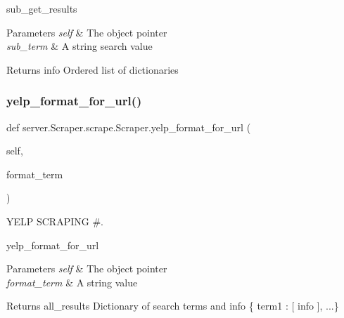 sub\+\_\+get\+\_\+results 
\begin{DoxyParams}{Parameters}
{\em self} & The object pointer \\
\hline
{\em sub\+\_\+term} & A string search value \\
\hline
\end{DoxyParams}
\begin{DoxyReturn}{Returns}
info Ordered list of dictionaries 
\end{DoxyReturn}
\mbox{\label{classserver_1_1_scraper_1_1scrape_1_1_scraper_ab6b8f8032bc10cbe520e5310703b8a9b}} 
\subsubsection{\texorpdfstring{yelp\+\_\+format\+\_\+for\+\_\+url()}{yelp\_format\_for\_url()}}
{\footnotesize\ttfamily def server.\+Scraper.\+scrape.\+Scraper.\+yelp\+\_\+format\+\_\+for\+\_\+url (\begin{DoxyParamCaption}\item[{}]{self,  }\item[{}]{format\+\_\+term }\end{DoxyParamCaption})}



Y\+E\+LP S\+C\+R\+A\+P\+I\+NG \#. 

yelp\+\_\+format\+\_\+for\+\_\+url 
\begin{DoxyParams}{Parameters}
{\em self} & The object pointer \\
\hline
{\em format\+\_\+term} & A string value \\
\hline
\end{DoxyParams}
\begin{DoxyReturn}{Returns}
all\+\_\+results Dictionary of search terms and info \{ term1 \+: \mbox{[} info \mbox{]}, ...\} 
\end{DoxyReturn}
\mbox{\label{classserver_1_1_scraper_1_1scrape_1_1_scraper_a90576b2f821edab37becd682ad41654c}} 
